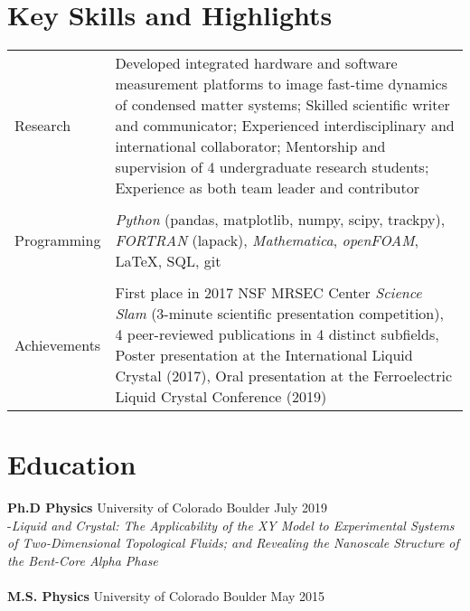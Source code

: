 \documentclass[12pt, a4paper]{scrartcl}
\begin{document}
\section*{Key Skills and Highlights}          
\vspace{-.1in}
\noindent \begin{tabular}{@{}l p{}}\\
    Research & Developed integrated hardware and software measurement
    platforms to image fast-time dynamics of condensed matter systems;
    Skilled scientific writer and communicator;
            Experienced interdisciplinary and international collaborator;
            Mentorship and supervision of 4 undergraduate research students;
            Experience as both team leader and contributor\\ \\
        Programming& \textit{Python} (pandas, matplotlib, numpy,
        scipy, trackpy), \textit{FORTRAN} (lapack), \textit{Mathematica},
    \textit{openFOAM}, \LaTeX, SQL, git\\ \\
            Achievements & First place in 2017 NSF MRSEC Center \textit{Science Slam}
    (3-minute scientific presentation competition), 4 peer-reviewed publications
    in 4 distinct subfields, Poster presentation at the International Liquid
    Crystal (2017), Oral presentation at the Ferroelectric Liquid Crystal
    Conference (2019)
\end{tabular}



\section*{Education}          
\vspace{-.1in}
   \noindent \textbf{Ph.D Physics}  University of Colorado Boulder \dotfill July 2019  \\        
    \indent -{\itshape Liquid and Crystal: The Applicability of the XY Model to
        Experimental Systems of Two-Dimensional Topological Fluids; and
    Revealing the Nanoscale Structure of the Bent-Core Alpha Phase} \\
    \vspace{-0.75em}
    \phantom{.}\\
\noindent\textbf{M.S. Physics} University of Colorado Boulder \dotfill  May 2015
\\
\vspace{-0.75em}
    \phantom{.}\\
\end{document}
